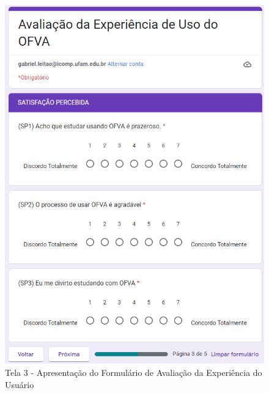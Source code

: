\begin{figure}[htb]
	\centering
	\includegraphics[width=0.8\linewidth]{chapters/appendixUX/UX_Tela3.png}
	\caption{Tela 3 - Apresentação do Formulário de Avaliação da Experiência do Usuário}
	\label{fig:UX_Tela3}
\end{figure}

